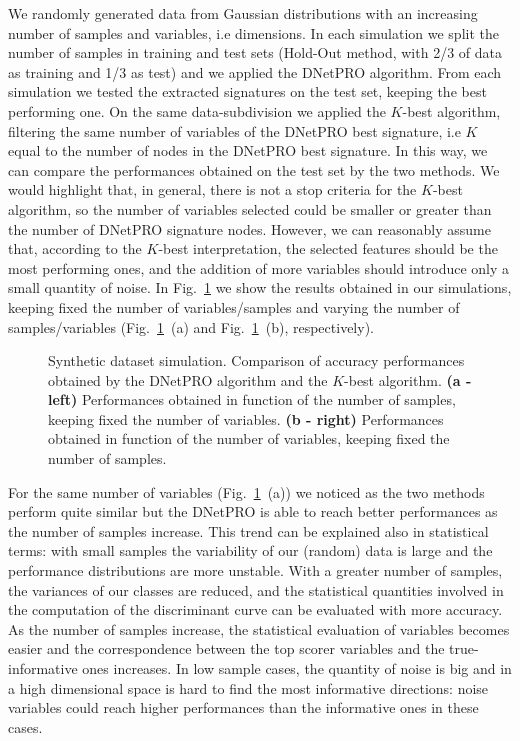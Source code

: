 \documentclass{standalone}
\begin{document}
We randomly generated data from Gaussian distributions with an increasing number of samples and variables, i.e dimensions.
In each simulation we split the number of samples in training and test sets (Hold-Out method, with 2/3 of data as training and 1/3 as test) and we applied the \textsf{DNetPRO} algorithm.
From each simulation we tested the extracted signatures on the test set, keeping the best performing one.
On the same data-subdivision we applied the $K$-best algorithm, filtering the same number of variables of the \textsf{DNetPRO} best signature, i.e $K$ equal to the number of nodes in the \textsf{DNetPRO} best signature.
In this way, we can compare the performances obtained on the test set by the two methods.
We would highlight that, in general, there is not a stop criteria for the $K$-best algorithm, so the number of variables selected could be smaller or greater than the number of \textsf{DNetPRO} signature nodes.
However, we can reasonably assume that, according to the $K$-best interpretation, the selected features should be the most performing ones, and the addition of more variables should introduce only a small quantity of noise.
In Fig.~\ref{fig:dnetpro_toy} we show the results obtained in our simulations, keeping fixed the number of variables/samples and varying the number of samples/variables (Fig.~\ref{fig:dnetpro_toy}~(a) and Fig.~\ref{fig:dnetpro_toy}~(b), respectively).

\begin{figure}[htbp]
\centering
\def\svgwidth{0.4\textwidth}

\qquad\qquad
\centering
\def\svgwidth{0.4\textwidth}

\caption{Synthetic dataset simulation.
Comparison of accuracy performances obtained by the \textsf{DNetPRO} algorithm and the $K$-best algorithm.
\textbf{(a - left)} Performances obtained in function of the number of samples, keeping fixed the number of variables.
\textbf{(b - right)} Performances obtained in function of the number of variables, keeping fixed the number of samples.
}
\label{fig:dnetpro_toy}
\end{figure}

For the same number of variables (Fig.~\ref{fig:dnetpro_toy}~(a)) we noticed as the two methods perform quite similar but the \textsf{DNetPRO} is able to reach better performances as the number of samples increase.
This trend can be explained also in statistical terms: with small samples the variability of our (random) data is large and the performance distributions are more unstable.
With a greater number of samples, the variances of our classes are reduced, and the statistical quantities involved in the computation of the discriminant curve can be evaluated with more accuracy.
As the number of samples increase, the statistical evaluation of variables becomes easier and the correspondence between the top scorer variables and the true-informative ones increases.
In low sample cases, the quantity of noise is big and in a high dimensional space is hard to find the most informative directions: noise variables could reach higher performances than the informative ones in these cases.
\end{document}
